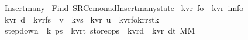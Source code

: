 %
\begin{isabellebody}%
%
%
\isadelimtheory
%
\endisadelimtheory
%
\isatagtheory
{}\isamarkupfalse%
\ Insert{\isacharunderscore}many\isanewline
{}\ Find\ {\isachardoublequoteopen}{\isachardollar}SRC{\isacharslash}c{\isacharunderscore}monad{\isacharslash}Insert{\isacharunderscore}many{\isacharunderscore}state{\isachardoublequoteclose}\isanewline
{}%
\endisatagtheory
{\isafoldtheory}%
%
\isadelimtheory
\isanewline
%
\endisadelimtheory
\isanewline
\isanewline
{}\isamarkupfalse%
\ {\isacharparenleft}{\isacharprime}k{\isacharcomma}{\isacharprime}v{\isacharcomma}{\isacharprime}r{\isacharparenright}\ fo\ {\isacharequal}\ {\isachardoublequoteopen}{\isacharparenleft}{\isacharprime}k{\isacharcomma}{\isacharprime}v{\isacharcomma}{\isacharprime}r{\isacharparenright}\ im{\isacharunderscore}fo{\isachardoublequoteclose}\isanewline
\isanewline
{}\isamarkupfalse%
\ {\isacharparenleft}{\isacharprime}k{\isacharcomma}{\isacharprime}v{\isacharcomma}{\isacharprime}r{\isacharparenright}\ d\ {\isacharequal}\ {\isachardoublequoteopen}{\isacharparenleft}{\isacharprime}k{\isacharcomma}{\isacharprime}v{\isacharcomma}{\isacharprime}r{\isacharparenright}fs\ {\isacharasterisk}\ {\isacharparenleft}{\isacharprime}v\ {\isacharasterisk}\ {\isacharparenleft}{\isacharprime}k{\isacharasterisk}{\isacharprime}v{\isacharparenright}s{\isacharparenright}{\isachardoublequoteclose}\isanewline
\isanewline
{}\isamarkupfalse%
\ {\isacharparenleft}{\isacharprime}k{\isacharcomma}{\isacharprime}v{\isacharcomma}{\isacharprime}r{\isacharparenright}\ u\ {\isacharequal}\ {\isachardoublequoteopen}{\isacharparenleft}{\isacharprime}k{\isacharcomma}{\isacharprime}v{\isacharcomma}{\isacharprime}r{\isacharparenright}fo{\isacharasterisk}{\isacharparenleft}{\isacharprime}k{\isacharcomma}{\isacharprime}r{\isacharparenright}rstk{\isachardoublequoteclose}\isanewline
\isanewline
\isanewline
\isanewline
\isanewline
{}\isamarkupfalse%
\ step{\isacharunderscore}down\ {\isacharcolon}{\isacharcolon}\ {\isachardoublequoteopen}{\isacharprime}k\ ps{}\ {\isasymRightarrow}\ {\isacharparenleft}{\isacharprime}k{\isacharcomma}{\isacharprime}v{\isacharcomma}{\isacharprime}r{\isacharcomma}{\isacharprime}t{\isacharparenright}\ store{\isacharunderscore}ops\ {\isasymRightarrow}\ {\isacharparenleft}{\isacharprime}k{\isacharcomma}{\isacharprime}v{\isacharcomma}{\isacharprime}r{\isacharparenright}d\ {\isasymRightarrow}\ {\isacharparenleft}{\isacharparenleft}{\isacharprime}k{\isacharcomma}{\isacharprime}v{\isacharcomma}{\isacharprime}r{\isacharparenright}\ d{\isacharcomma}{\isacharprime}t{\isacharparenright}\ MM{\isachardoublequoteclose}\ \isanewline

\end{isabellebody}
